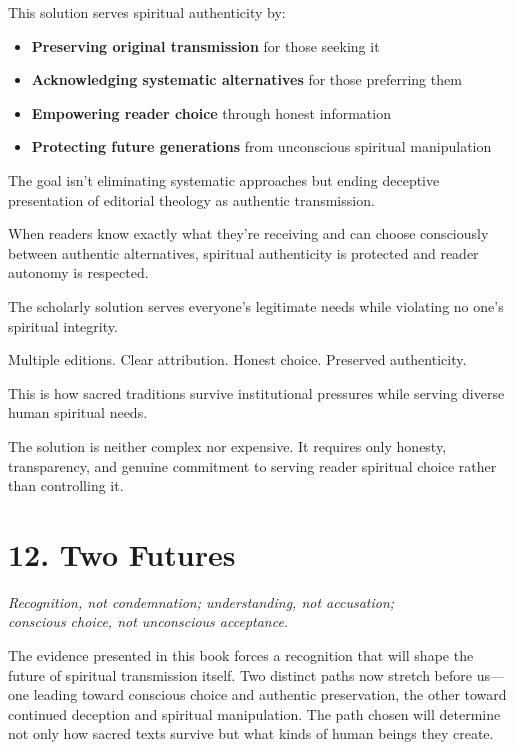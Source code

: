 \documentclass[11pt,twoside]{book}
\begin{document}
This solution serves spiritual authenticity by:
\begin{itemize}
\item \textbf{\textbf{Preserving original transmission}} for those seeking it
\item \textbf{\textbf{Acknowledging systematic alternatives}} for those preferring them
\item \textbf{\textbf{Empowering reader choice}} through honest information
\item \textbf{\textbf{Protecting future generations}} from unconscious spiritual manipulation
\end{itemize}

The goal isn't eliminating systematic approaches but ending deceptive presentation of editorial theology as authentic transmission.

When readers know exactly what they're receiving and can choose consciously between authentic alternatives, spiritual authenticity is protected and reader autonomy is respected.

The scholarly solution serves everyone's legitimate needs while violating no one's spiritual integrity.

Multiple editions. Clear attribution. Honest choice. Preserved authenticity.

This is how sacred traditions survive institutional pressures while serving diverse human spiritual needs.

The solution is neither complex nor expensive. It requires only honesty, transparency, and genuine commitment to serving reader spiritual choice rather than controlling it.
\chapter*{12. Two Futures}
\label{sec:org1d41c34}

{\centering\itshape Recognition, not condemnation; understanding, not accusation;\\conscious choice, not unconscious acceptance.\par}
\vspace{0.3cm}

\normalfont\justifying
The evidence presented in this book forces a recognition that will shape the future of spiritual transmission itself. Two distinct paths now stretch before us—one leading toward conscious choice and authentic preservation, the other toward continued deception and spiritual manipulation. The path chosen will determine not only how sacred texts survive but what kinds of human beings they create.
\end{document}

